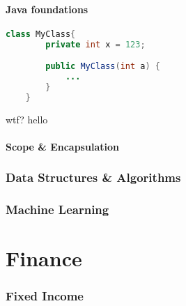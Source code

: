 \documentclass[10pt,a4paper,fleqn]{article} %
\begin{document}
\subsection{Java foundations} %

\begin{lstlisting}[language=Java,style=javac]
    class MyClass{
        private int x = 123;

        public MyClass(int a) {
            ...
        }
    }
\end{lstlisting}
wtf?
hello


\subsection{Scope \& Encapsulation} %


\section{Data Structures \& Algorithms} %

\section{Machine Learning} %

\newpage

\part {Finance}

\section{Fixed Income} %
\end{document}
